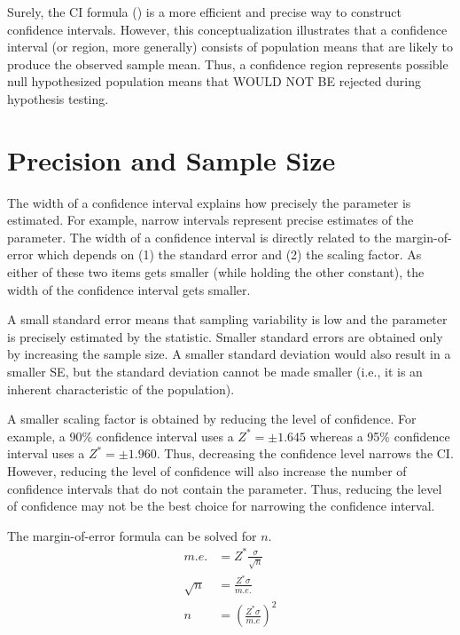 \documentclass[10pt,openany]{book}\usepackage[]{graphicx}\usepackage[]{color}
\begin{document}
Surely, the CI formula () is a more efficient and precise way to construct confidence intervals. However, this conceptualization illustrates that a confidence interval (or region, more generally) consists of population means that are likely to produce the observed sample mean. Thus, a confidence region represents possible null hypothesized population means that WOULD NOT BE rejected during hypothesis testing.



\section{Precision and Sample Size}
The width of a confidence interval explains how precisely the parameter is estimated. For example, narrow intervals represent precise estimates of the parameter. The width of a confidence interval is directly related to the margin-of-error which depends on (1) the standard error and (2) the scaling factor. As either of these two items gets smaller (while holding the other constant), the width of the confidence interval gets smaller.

A small standard error means that sampling variability is low and the parameter is precisely estimated by the statistic. Smaller standard errors are obtained only by increasing the sample size. A smaller standard deviation would also result in a smaller SE, but the standard deviation cannot be made smaller (i.e., it is an inherent characteristic of the population).

A smaller scaling factor is obtained by reducing the level of confidence. For example, a 90\% confidence interval uses a $Z^{*}=\pm1.645$ whereas a 95\% confidence interval uses a $Z^{*}=\pm1.960$. Thus, decreasing the confidence level narrows the CI. However, reducing the level of confidence will also increase the number of confidence intervals that do not contain the parameter. Thus, reducing the level of confidence may not be the best choice for narrowing the confidence interval.

The margin-of-error formula can be solved for $n$.
\[
  \begin{split}
    m.e. &= Z^{*}\frac{\sigma}{\sqrt{n}} \\
    \sqrt{n} &= \frac{Z^{*}\sigma}{m.e.} \\
    n &= \left(\frac{Z^{*}\sigma}{m.e}\right)^{2} \\
  \end{split}
\]
\end{document}
